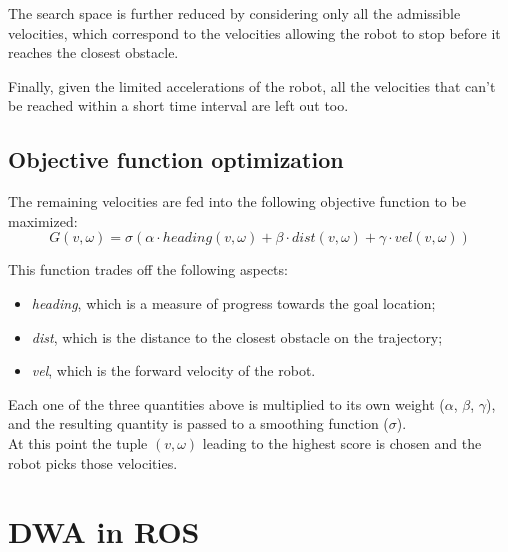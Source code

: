 \documentclass[11pt,a4paper]{article}
\begin{document}
The search space is further reduced by considering only all the admissible velocities, which correspond to
the velocities allowing the robot to stop before it reaches the closest obstacle.

Finally, given the limited accelerations of the robot, all the velocities that can't be reached within a short
time interval are left out too.\\



\subsection{Objective function optimization}

The remaining velocities are fed into the following objective function to be maximized:
$$ G(v, \omega) = \sigma(\alpha \cdot heading(v, \omega) + \beta \cdot dist(v, \omega) + \gamma \cdot vel(v, \omega)) $$

This function trades off the following aspects:
\begin{itemize}
    \item \textit{heading}, which is a measure of progress towards the goal location;
    \item \textit{dist}, which is the distance to the closest obstacle on the trajectory;
    \item \textit{vel}, which is the forward velocity of the robot.\\
\end{itemize}

Each one of the three quantities above is multiplied to its own weight ($\alpha$, $\beta$, $\gamma$), and the resulting quantity is passed to a smoothing function ($\sigma$).\\

At this point the tuple $(v, \omega)$ leading to the highest score is chosen and the robot picks those velocities.\\





\section{DWA in ROS}
\end{document}
